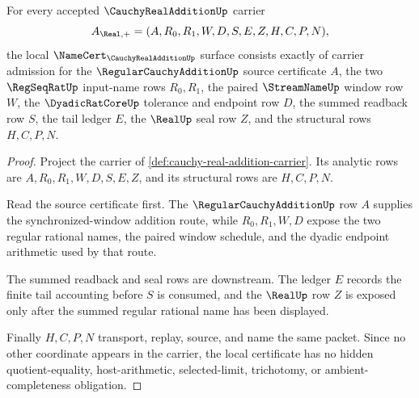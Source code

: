 \begin{theorem}
\label{thm:cauchy-real-addition-namecert-obligations}
For every accepted $\CauchyRealAdditionUp$ carrier
$$
A_{\Real,+}=(A,R_0,R_1,W,D,S,E,Z,H,C,P,N),
$$
the local $\NameCert_{\CauchyRealAdditionUp}$ surface consists exactly of carrier admission for the $\RegularCauchyAdditionUp$ source certificate $A$, the two $\RegSeqRatUp$ input-name rows $R_0,R_1$, the paired $\StreamNameUp$ window row $W$, the $\DyadicRatCoreUp$ tolerance and endpoint row $D$, the summed readback row $S$, the tail ledger $E$, the $\RealUp$ seal row $Z$, and the structural rows $H,C,P,N$.
\end{theorem}
\begin{proof}
Project the carrier of \autoref{def:cauchy-real-addition-carrier}. Its analytic rows are $A,R_0,R_1,W,D,S,E,Z$, and its structural rows are $H,C,P,N$.

Read the source certificate first. The $\RegularCauchyAdditionUp$ row $A$ supplies the synchronized-window addition route, while $R_0,R_1,W,D$ expose the two regular rational names, the paired window schedule, and the dyadic endpoint arithmetic used by that route.

The summed readback and seal rows are downstream. The ledger $E$ records the finite tail accounting before $S$ is consumed, and the $\RealUp$ row $Z$ is exposed only after the summed regular rational name has been displayed.

Finally $H,C,P,N$ transport, replay, source, and name the same packet. Since no other coordinate appears in the carrier, the local certificate has no hidden quotient-equality, host-arithmetic, selected-limit, trichotomy, or ambient-completeness obligation.
\end{proof}

